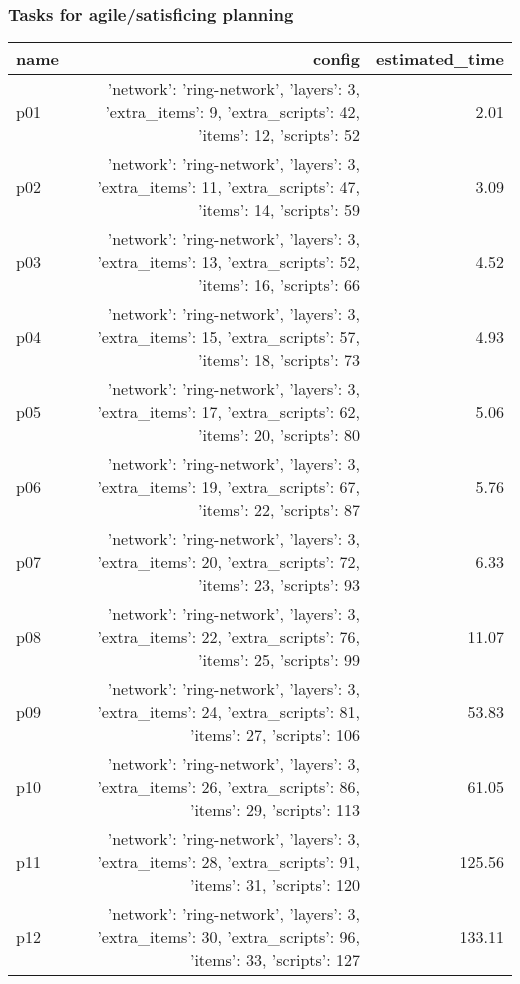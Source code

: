 \documentclass{article}
\begin{document}
                                \subsubsection*{Tasks for agile/satisficing planning}
                                
                            \begin{center}
                            \scriptsize
                            \begin{tabular}{@{}l|r|r@{}}
                            name & config & estimated\_time\\\midrule
                              p01&{'network': 'ring-network', 'layers': 3, 'extra\_items': 9, 'extra\_scripts': 42, 'items': 12, 'scripts': 52}&2.01\\
  p02&{'network': 'ring-network', 'layers': 3, 'extra\_items': 11, 'extra\_scripts': 47, 'items': 14, 'scripts': 59}&3.09\\
  p03&{'network': 'ring-network', 'layers': 3, 'extra\_items': 13, 'extra\_scripts': 52, 'items': 16, 'scripts': 66}&4.52\\
  p04&{'network': 'ring-network', 'layers': 3, 'extra\_items': 15, 'extra\_scripts': 57, 'items': 18, 'scripts': 73}&4.93\\
  p05&{'network': 'ring-network', 'layers': 3, 'extra\_items': 17, 'extra\_scripts': 62, 'items': 20, 'scripts': 80}&5.06\\
  p06&{'network': 'ring-network', 'layers': 3, 'extra\_items': 19, 'extra\_scripts': 67, 'items': 22, 'scripts': 87}&5.76\\
  p07&{'network': 'ring-network', 'layers': 3, 'extra\_items': 20, 'extra\_scripts': 72, 'items': 23, 'scripts': 93}&6.33\\
  p08&{'network': 'ring-network', 'layers': 3, 'extra\_items': 22, 'extra\_scripts': 76, 'items': 25, 'scripts': 99}&11.07\\
  p09&{'network': 'ring-network', 'layers': 3, 'extra\_items': 24, 'extra\_scripts': 81, 'items': 27, 'scripts': 106}&53.83\\
  p10&{'network': 'ring-network', 'layers': 3, 'extra\_items': 26, 'extra\_scripts': 86, 'items': 29, 'scripts': 113}&61.05\\
  p11&{'network': 'ring-network', 'layers': 3, 'extra\_items': 28, 'extra\_scripts': 91, 'items': 31, 'scripts': 120}&125.56\\
  p12&{'network': 'ring-network', 'layers': 3, 'extra\_items': 30, 'extra\_scripts': 96, 'items': 33, 'scripts': 127}&133.11\\

\end{tabular}
\end{center}
\end{document}
